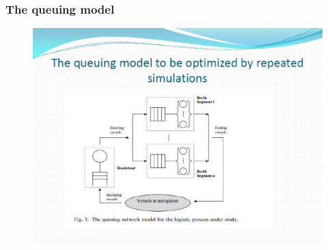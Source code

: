 \documentclass{beamer}
\begin{document}
\begin{frame}
\frametitle{The queuing model }
\begin{figure}[!th]
\begin{center}
\includegraphics[width=1\textwidth]{img/pic6.eps}
\end{center}
\end{figure}
\end{frame}
\end{document}
